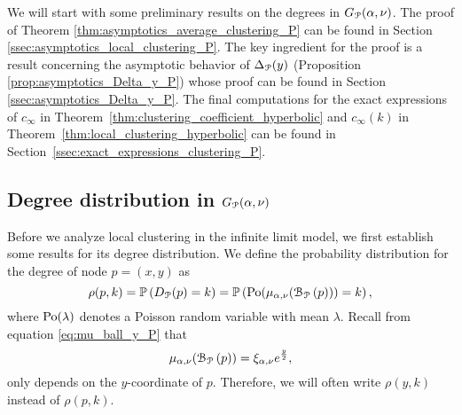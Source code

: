 We will start with some preliminary results on the degrees in $G_{{\mathcal P}}(\alpha, \nu)$. The proof of Theorem \ref{thm:asymptotics_average_clustering_P} can be found in Section \ref{ssec:asymptotics_local_clustering_P}. The key ingredient for the proof is a result concerning the asymptotic behavior of $\Delta_{{\mathcal P}}(y)$ (Proposition \ref{prop:asymptotics_Delta_y_P}) whose proof can be found in Section \ref{ssec:asymptotics_Delta_y_P}. The final computations for the exact expressions of $c_\infty$ in Theorem~\ref{thm:clustering_coefficient_hyperbolic} and $c_\infty(k)$ in Theorem~\ref{thm:local_clustering_hyperbolic} can be found in Section~\ref{ssec:exact_expressions_clustering_P}.

\subsection{Degree distribution in $G_{{\mathcal P}}(\alpha, \nu)$}

Before we analyze local clustering in the infinite limit model, we first establish some results for its degree distribution.  We define the probability distribution for the degree of node $p = (x,y)$  as
\begin{equation}
	\rho(p,k) = \mathbb{P}\left(D_{{\mathcal P}}(p) = k\right) = \mathbb{P}\left({\mathrm{Po}}(\mu_{\alpha,\nu}({\mathcal B}_{{\mathcal P}}\left(p\right))) = k\right),
\end{equation}
where ${\mathrm{Po}}(\lambda)$ denotes a Poisson random variable with mean $\lambda$. Recall from equation \eqref{eq:mu_ball_y_P} that
\[
	\mu_{\alpha,\nu}({\mathcal B}_{{\mathcal P}}\left(p\right)) = \xi_{\alpha,\nu} e^{\frac{y}{2}},
\]
only depends on the $y$-coordinate of $p$. Therefore, we will often write $\rho(y,k)$ instead of $\rho(p,k)$.

